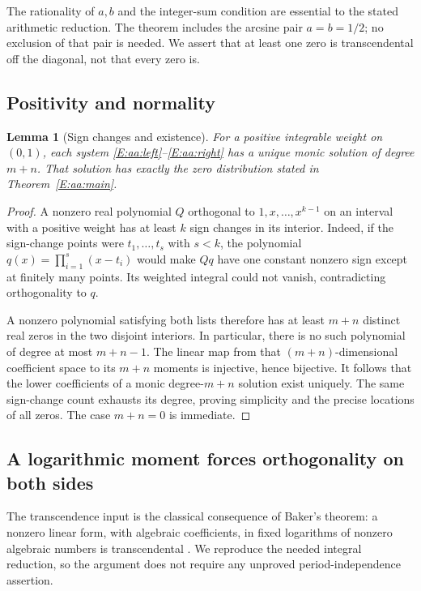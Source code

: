 \documentclass[11pt,a4paper]{article}
\newtheorem{lemma}[theorem]{Lemma}
\theoremstyle{definition}
\theoremstyle{remark}
\numberwithin{equation}{section}
\begin{document}
The rationality of $a,b$ and the integer-sum condition are essential to
the stated arithmetic reduction. The theorem includes the arcsine pair
$a=b=1/2$; no exclusion of that pair is needed. We assert that at least
one zero is transcendental off the diagonal, not that every zero is.

\subsection{Positivity and normality}

\begin{lemma}[Sign changes and existence]\label{E:aa:normality}
For a positive integrable weight on $(0,1)$, each system
\eqref{E:aa:left}--\eqref{E:aa:right} has a unique monic solution of
degree $m+n$. That solution has exactly the zero distribution stated
in Theorem~\ref{E:aa:main}.
\end{lemma}

\begin{proof}
A nonzero real polynomial $Q$ orthogonal to
$1,x,\ldots,x^{k-1}$ on an interval with a positive weight has at
least $k$ sign changes in its interior. Indeed, if the sign-change
points were $t_1,\ldots,t_s$ with $s<k$, the polynomial
$q(x)=\prod_{i=1}^s(x-t_i)$ would make $Qq$ have one constant
nonzero sign except at finitely many points. Its weighted integral
could not vanish, contradicting orthogonality to $q$.

A nonzero polynomial satisfying both lists therefore has at least
$m+n$ distinct real zeros in the two disjoint interiors. In particular,
there is no such polynomial of degree at most $m+n-1$. The linear map
from that $(m+n)$-dimensional coefficient space to its $m+n$ moments
is injective, hence bijective. It follows that the lower coefficients
of a monic degree-$m+n$ solution exist uniquely. The same sign-change
count exhausts its degree, proving simplicity and the precise locations
of all zeros. The case $m+n=0$ is immediate.
\end{proof}

\subsection{A logarithmic moment forces orthogonality on both sides}

The transcendence input is the classical consequence of Baker's theorem:
a nonzero linear form, with algebraic coefficients, in fixed logarithms
of nonzero algebraic numbers is transcendental
\cite{aa:BakerIII}. We reproduce the needed integral reduction, so the
argument does not require any unproved period-independence assertion.
\end{document}

